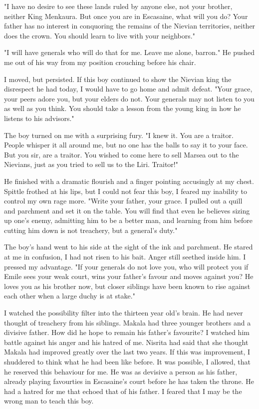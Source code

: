 \documentclass{article}
\begin{document}
"I have no desire to see these lands ruled by anyone else, not your brother, neither King Menkaura. But once you are in Escasaine, what will you do? Your father has no interest in conquoring the remains of the Nievian territories, neither does the crown. You should learn to live with your neighbors."

"I will have generals who will do that for me. Leave me alone, barron." He pushed me out of his way from my position crouching before his chair.

I moved, but persisted. If this boy continued to show the Nievian king the disrespect he had today, I would have to go home and admit defeat. "Your grace, your peers adore you, but your elders do not. Your generals may not listen to you as well as you think. You should take a lesson from the young king in how he listens to his advisors."

The boy turned on me with a surprising fury. "I knew it. You are a traitor. People whisper it all around me, but no one has the balls to say it to your face. But you sir, are a traitor. You wished to come here to sell Marsea out to the Nievians, just as you tried to sell us to the Liri. Traitor!"

He finished with a dramatic flourish and a finger pointing accusingly at my chest. Spittle frothed at his lips, but I could not fear this boy, I feared my inability to control my own rage more. "Write your father, your grace. I pulled out a quill and parchment and set it on the table. You will find that even he believes sizing up one's enemy, admitting him to be a better man, and learning from him before cutting him down is not treachery, but a general's duty."

The boy's hand went to his side at the sight of the ink and parchment. He stared at me in confusion, I had not risen to his bait. Anger still seethed inside him. I pressed my advantage. "If your generals do not love you, who will protect you if Emile sees your weak court, wins your father's favour and moves against you? He loves you as his brother now, but closer siblings have been known to rise against each other when a large duchy is at stake."

I watched the possibility filter into the thirteen year old's brain. He had never thought of treachery from his siblings. Makala had three younger brothers and a divisive father. How did he hope to remain his father's favourite? I watched him battle against his anger and his hatred of me. Nisrita had said that she thought Makala had improved greatly over the last two years. If this was improvement, I shuddered to think what he had been like before. It was possible, I allowed, that he reserved this behaviour for me. He was as devisive a person as his father, already playing favourties in Escasaine's court before he has taken the throne. He had a hatred for me that echoed that of his father. I feared that I may be the wrong man to teach this boy.
\end{document}
